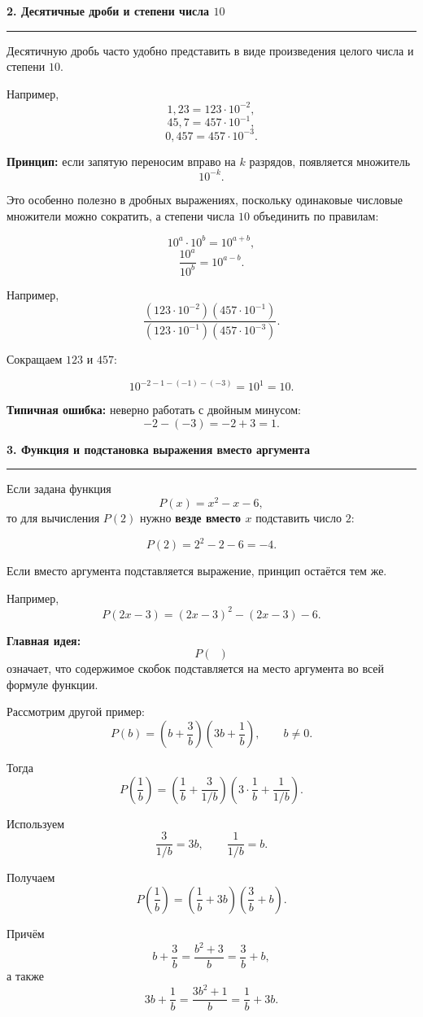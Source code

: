 \documentclass[a4paper,12pt]{article}
\newcommand{\lessonsection}[1]{%
    \vspace{0.5em}
    {\Large\bfseries\color{darkaccent}#1}\par
    \vspace{0.2em}
    {\color{accent}\rule{\linewidth}{0.6pt}}
    \vspace{0.5em}
}
\newcommand{\important}[1]{\textbf{\color{darkaccent}#1}}
\begin{document}
\lessonsection{2. Десятичные дроби и степени числа \(10\)}

Десятичную дробь часто удобно представить в виде произведения целого числа и степени \(10\).

Например,
\[
1{,}23=123\cdot10^{-2},
\]
\[
45{,}7=457\cdot10^{-1},
\]
\[
0{,}457=457\cdot10^{-3}.
\]

\important{Принцип:} если запятую переносим вправо на \(k\) разрядов, появляется множитель
\[
10^{-k}.
\]

Это особенно полезно в дробных выражениях, поскольку одинаковые числовые множители можно сократить, а степени числа \(10\) объединить по правилам:

\[
10^a\cdot10^b=10^{a+b},
\]
\[
\frac{10^a}{10^b}=10^{a-b}.
\]

Например,
\[
\frac{
(123\cdot10^{-2})(457\cdot10^{-1})
}{
(123\cdot10^{-1})(457\cdot10^{-3})
}.
\]

Сокращаем \(123\) и \(457\):

\[
10^{-2-1-(-1)-(-3)}
=
10^1
=
10.
\]

\important{Типичная ошибка:} неверно работать с двойным минусом:
\[
-2-(-3)=-2+3=1.
\]


\lessonsection{3. Функция и подстановка выражения вместо аргумента}

Если задана функция
\[
P(x)=x^2-x-6,
\]
то для вычисления \(P(2)\) нужно \textbf{везде вместо \(x\)} подставить число \(2\):

\[
P(2)=2^2-2-6=-4.
\]

Если вместо аргумента подставляется выражение, принцип остаётся тем же.

Например,
\[
P(2x-3)
=
(2x-3)^2-(2x-3)-6.
\]

\important{Главная идея:}
\[
P(\boxed{\phantom{x}})
\]
означает, что содержимое скобок подставляется на место аргумента во всей формуле функции.

Рассмотрим другой пример:
\[
P(b)=
\left(b+\frac{3}{b}\right)
\left(3b+\frac{1}{b}\right),
\qquad b\ne0.
\]

Тогда
\[
P\left(\frac1b\right)
=
\left(
\frac1b+
\frac{3}{1/b}
\right)
\left(
3\cdot\frac1b+
\frac{1}{1/b}
\right).
\]

Используем
\[
\frac{3}{1/b}=3b,
\qquad
\frac{1}{1/b}=b.
\]

Получаем
\[
P\left(\frac1b\right)
=
\left(\frac1b+3b\right)
\left(\frac3b+b\right).
\]

Причём
\[
b+\frac3b=\frac{b^2+3}{b}
=
\frac3b+b,
\]
а также
\[
3b+\frac1b=\frac{3b^2+1}{b}
=
\frac1b+3b.
\]
\end{document}

